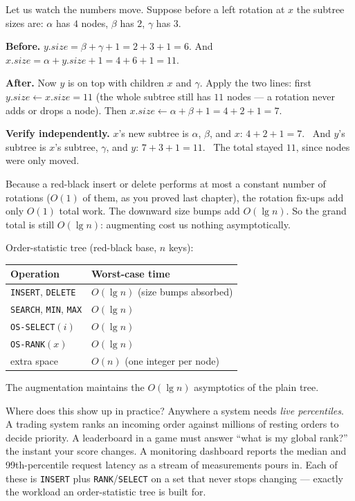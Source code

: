 \begin{labbox}
Let us watch the numbers move. Suppose before a left rotation at $x$ the subtree
sizes are: $\alpha$ has $4$ nodes, $\beta$ has $2$, $\gamma$ has $3$.

\textbf{Before.} $y.\mathit{size} = \beta + \gamma + 1 = 2 + 3 + 1 = 6$. And
$x.\mathit{size} = \alpha + y.\mathit{size} + 1 = 4 + 6 + 1 = 11$.

\textbf{After.} Now $y$ is on top with children $x$ and $\gamma$. Apply the two
lines: first $y.\mathit{size} \gets x.\mathit{size} = 11$ (the whole subtree
still has $11$ nodes --- a rotation never adds or drops a node). Then
$x.\mathit{size} \gets \alpha + \beta + 1 = 4 + 2 + 1 = 7$.

\textbf{Verify independently.} $x$'s new subtree is $\alpha$, $\beta$, and $x$:
$4 + 2 + 1 = 7$. \checkmark\ And $y$'s subtree is $x$'s subtree, $\gamma$, and
$y$: $7 + 3 + 1 = 11$. \checkmark\ The total stayed $11$, since nodes were only moved.
\end{labbox}

Because a red-black insert or delete performs at most a constant number of
rotations ($O(1)$ of them, as you proved last chapter), the rotation fix-ups add
only $O(1)$ total work. The downward size bumps add $O(\lg n)$. So the grand
total is still $O(\lg n)$: augmenting cost us nothing asymptotically.

\begin{complexitybox}
Order-statistic tree (red-black base, $n$ keys):
\begin{center}
\begin{tabular}{ll}
\toprule
Operation & Worst-case time \\
\midrule
\texttt{INSERT}, \texttt{DELETE} & $O(\lg n)$ (size bumps absorbed) \\
\texttt{SEARCH}, \texttt{MIN}, \texttt{MAX} & $O(\lg n)$ \\
\texttt{OS-SELECT}$(i)$ & $O(\lg n)$ \\
\texttt{OS-RANK}$(x)$ & $O(\lg n)$ \\
extra space & $O(n)$ (one integer per node) \\
\bottomrule
\end{tabular}
\end{center}
The augmentation maintains the $O(\lg n)$ asymptotics of the plain tree.
\end{complexitybox}

\begin{aestheticbox}
Where does this show up in practice? Anywhere a system needs \emph{live
percentiles}. A trading system ranks an incoming order against millions of
resting orders to decide priority. A leaderboard in a game must answer ``what is
my global rank?'' the instant your score changes. A monitoring dashboard reports
the median and 99th-percentile request latency as a stream of measurements pours
in. Each of these is \texttt{INSERT} plus \texttt{RANK}/\texttt{SELECT} on a set
that never stops changing --- exactly the workload an order-statistic tree is built for.
\end{aestheticbox}

